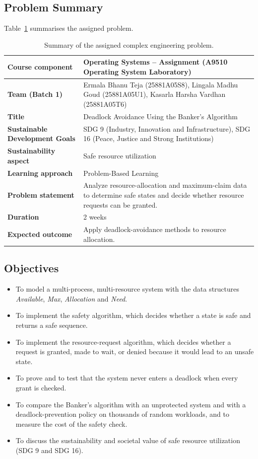 \documentclass[11pt,a4paper]{report}
\begin{document}
\subsection{Problem Summary}
Table~\ref{tab:summary} summarises the assigned problem.

\begin{table}[h!]
\centering
\caption{Summary of the assigned complex engineering problem.}
\label{tab:summary}
\small
\renewcommand{\arraystretch}{1.25}
\begin{tabular}{|>{\bfseries}p{3.6cm}|p{11.2cm}|}
\hline
Course component & Operating Systems -- Assignment (A9510 Operating System Laboratory) \\ \hline
Team (Batch 1) & Ermala Bhanu Teja (25881A05S8), Lingala Madhu Goud (25881A05U1), Kasarla Harsha Vardhan (25881A05T6) \\ \hline
Title & Deadlock Avoidance Using the Banker's Algorithm \\ \hline
Sustainable Development Goals & SDG 9 (Industry, Innovation and Infrastructure), SDG 16 (Peace, Justice and Strong Institutions) \\ \hline
Sustainability aspect & Safe resource utilization \\ \hline
Learning approach & Problem-Based Learning \\ \hline
Problem statement & Analyze resource-allocation and maximum-claim data to determine safe states and decide whether resource requests can be granted. \\ \hline
Duration & 2 weeks \\ \hline
Expected outcome & Apply deadlock-avoidance methods to resource allocation. \\ \hline
\end{tabular}
\end{table}

\subsection{Objectives}
\begin{itemize}
    \item To model a multi-process, multi-resource system with the data structures \emph{Available}, \emph{Max}, \emph{Allocation} and \emph{Need}.
    \item To implement the safety algorithm, which decides whether a state is safe and returns a safe sequence.
    \item To implement the resource-request algorithm, which decides whether a request is granted, made to wait, or denied because it would lead to an unsafe state.
    \item To prove and to test that the system never enters a deadlock when every grant is checked.
    \item To compare the Banker's algorithm with an unprotected system and with a deadlock-prevention policy on thousands of random workloads, and to measure the cost of the safety check.
    \item To discuss the sustainability and societal value of safe resource utilization (SDG 9 and SDG 16).
\end{itemize}
\end{document}
